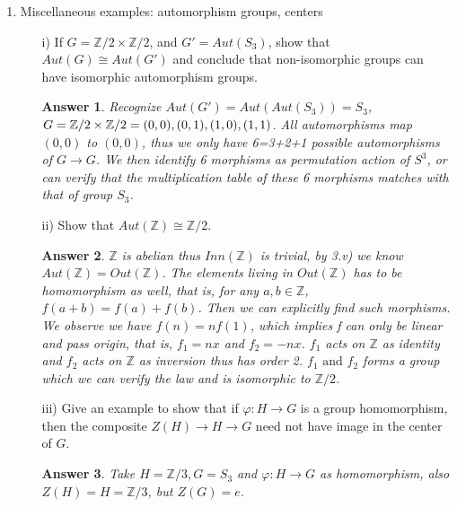 \documentclass[11pt,leqno]{article}
\newcommand{\Z}{{\mathbb Z}}
\newcommand{\<}[1]{{\langle}#1 {\rangle}}
\theoremstyle{plain}
\newtheorem*{answer*}{Answer}
\theoremstyle{definition}
\theoremstyle{remark}
\numberwithin{equation}{section}
\begin{document}
\begin{enumerate}
    
    \phantom \\
    \phantom \\
    \phantom \\
    \phantom \\
    \phantom \\
    \phantom \\
\item Miscellaneous examples: automorphism groups, centers
    \begin{itemize}
    \item[i)] If $G = \Z/2 \times \Z/2$, and $G' = Aut(S_3)$, show that $Aut(G) \cong Aut(G')$ and conclude that non-isomorphic groups can have isomorphic automorphism groups.
        \begin{answer*}
        Recognize $Aut(G') = Aut(Aut(S_3))=S_3$, $G=\Z/2 \times \Z/2 = {(0,0),(0,1),\\(1,0),(1,1)}$. All automorphisms map $(0,0)$ to $(0,0)$, thus we only have 6=3+2+1 possible automorphisms of $G \rightarrow G$. We then identify 6 morphisms as permutation action of $S^3$, or can verify that the multiplication table of these 6 morphisms matches with that of group $S_3$. 
        \end{answer*}
    \item[ii)] Show that $Aut(\Z) \cong \Z/2$.
        \begin{answer*}
        $\Z$ is abelian thus $Inn(\Z)$ is trivial, by 3.v) we know $Aut(\Z)=Out(\Z)$. The elements living in $Out(\Z)$ has to be homomorphism as well, that is, for any $a,b \in \Z$, $f(a+b)=f(a)+f(b)$. Then we can explicitly find such morphisms. We observe we have $f(n)=nf(1)$, which implies f can only be linear and pass origin, that is, $f_1=nx$ and $f_2=-nx$. $f_1$ acts on $\Z$ as identity and $f_2$ acts on $\Z$ as inversion thus has order 2. $f_1 \textrm{ and } f_2$ forms a group which we can verify the law and is isomorphic to $\Z/2$.    
        \end{answer*}
    \item[iii)] Give an example to show that if $\varphi: H \to G$ is a group homomorphism, then the composite $Z(H)\to H \to G$ need not have image in the center of $G$.
        \begin{answer*}
        Take $H=\Z/3,G=S_3$ and $\varphi : H \rightarrow G$ as homomorphism, also $Z(H)=H=\Z/3$, but $Z(G)={e}$. 
        \end{answer*}
    \end{itemize}
    

\end{enumerate}
\end{document}
